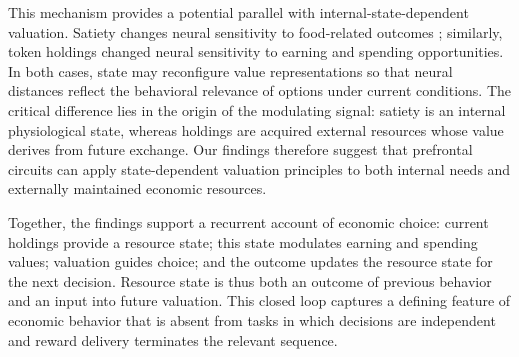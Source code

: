 \documentclass[pdflatex,sn-mathphys-num]{sn-jnl}%
\begin{document}
This mechanism provides a potential parallel with internal-state-dependent valuation. Satiety changes neural sensitivity to food-related outcomes \citep{pastorbernier2021satiety,howard2017devaluation}; similarly, token holdings changed neural sensitivity to earning and spending opportunities. In both cases, state may reconfigure value representations so that neural distances reflect the behavioral relevance of options under current conditions. The critical difference lies in the origin of the modulating signal: satiety is an internal physiological state, whereas holdings are acquired external resources whose value derives from future exchange. Our findings therefore suggest that prefrontal circuits can apply state-dependent valuation principles to both internal needs and externally maintained economic resources.

Together, the findings support a recurrent account of economic choice: current holdings provide a resource state; this state modulates earning and spending values; valuation guides choice; and the outcome updates the resource state for the next decision. Resource state is thus both an outcome of previous behavior and an input into future valuation. This closed loop captures a defining feature of economic behavior that is absent from tasks in which decisions are independent and reward delivery terminates the relevant sequence.
\end{document}
